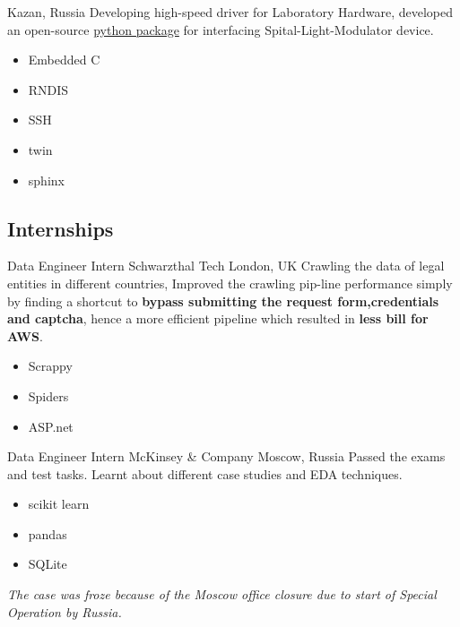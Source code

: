         {Kazan, Russia}
        {
        \newline
        Developing high-speed driver for Laboratory Hardware, developed an open-source \href{https://pypi.org/project/holoeye-embedded/}{\color{blue}python package} for interfacing Spital-Light-Modulator device.    
        } 
        {
        \begin{itemize}
            \item Embedded C
            \item RNDIS
            \item SSH
            \item twin
            \item sphinx
        \end{itemize}
        }



\vspace{2mm}
\subsection{\Large{Internships}}


                {Data Engineer Intern}
                {Schwarzthal Tech}
                {London, UK}
                {
                \newline
                Crawling the data of legal entities in different countries, Improved the crawling pip-line performance simply by finding a shortcut to \textbf{bypass submitting the request form,credentials and captcha}, hence a more efficient pipeline which resulted in \textbf{less bill for AWS}.  } 
                {
                \begin{itemize}
                    \item Scrappy
                    \item Spiders
                    \item ASP.net 
                \end{itemize}
                }
        
        {Data Engineer Intern}
        {McKinsey \& Company}
        {Moscow, Russia}
        {
        \newline
        Passed the exams and test tasks.
        Learnt about different case studies and EDA techniques.
        } 
        {
        \begin{itemize}
            \item scikit learn
            \item pandas
            \item SQLite
        \end{itemize}
        \textit{The case was froze because of the Moscow office closure due to start of Special Operation by Russia.}
        }
        

